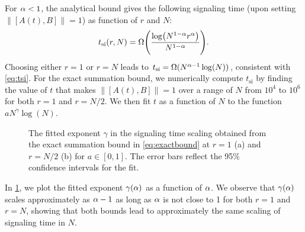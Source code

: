 For $\alpha < 1$, the analytical bound gives the following signaling time (upon setting $\|[A(t),B]\|= 1$) as function of $r$ and $N$:
\begin{equation}
	\label{eq:contour_al<d}
	t_\text{si}(r,N) =\W{\frac{\log(N^{1-\al}r^{\al})}{N^{1-\al}}}.
\end{equation}
Choosing either $r=1$ or $r=N$ leads to $t_\text{si}=\Omega(N^{\alpha-1}\log(N))$, consistent with \cref{eq:tsi}. For the exact summation bound, we numerically compute $t_\text{si}$ by finding the value of $t$ that makes $\|[A(t),B]\| = 1$ over a range of $N$ from $10^4$ to $10^6$ for both $r = 1$ and $r = N/2$. We then fit $t$ as a function of $N$ to the function $a N^\gamma \log(N)$.
\begin{figure}[h]
	 \qquad
	\caption[The fitted exponent in the signaling time scaling obtained from the exact summation bound]{The fitted exponent $\gamma$ in the signaling time scaling obtained from the exact summation bound in \cref{eq:exactbound} at $r=1$ (a) and $r=N/2$ (b) for $a\in [0,1]$. The error bars reflect the 95\% confidence intervals for the fit.}
        \label{Fig_al<d}
\end{figure}
In \cref{Fig_al<d}, we plot the fitted exponent $\gamma(\alpha)$ as a function of $\alpha$. We observe that $\gamma(\alpha)$ scales approximately as $\alpha-1$ as long as $\alpha$ is not close to 1 for both $r=1$ and $r=N$, showing that both bounds lead to approximately the same scaling of signaling time in $N$.

